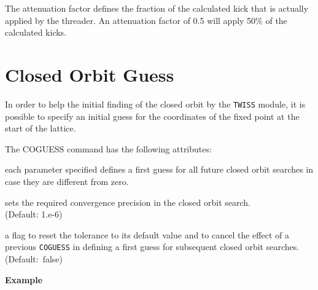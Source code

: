 The attenuation factor defines the fraction of the calculated kick that
is actually applied by the threader.  
An attenuation factor of 0.5 will apply 50\% of the calculated kicks.

\section{Closed Orbit Guess}
\label{subsec:coguess}

In order to help the initial finding of the closed orbit by the
{\tt TWISS} module, it is possible to specify an initial guess for
the coordinates of the fixed point at the start of the lattice.


The COGUESS command has the following attributes:
\begin{madlist}
   each parameter specified defines a first guess for all future closed orbit
  searches in case they are different from zero.  
  
   sets the required convergence precision in the closed
  orbit search. \\ (Default: 1.e-6)  
  
   a flag to reset the tolerance to its default value and to
  cancel the effect of a previous {\tt COGUESS} in defining a first
  guess for subsequent closed orbit searches. \\ (Default:~false) 

\end{madlist}


\textbf{Example}\\



